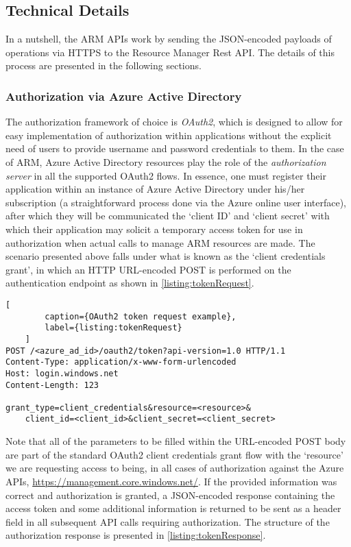 \documentclass[11pt]{report}
\begin{document}
\subsection{Technical Details}

In a nutshell, the ARM APIs work by sending the JSON-encoded payloads of
operations via HTTPS to the Resource Manager Rest API. The details
of this process are presented in the following sections.

\subsubsection{Authorization via Azure Active Directory}

The authorization framework of choice is \textit{OAuth2}, which is designed to
allow for easy implementation of authorization within applications without the
explicit need of users to provide username and password credentials to them. In
the case of ARM, Azure Active Directory resources play the role of the
\textit{authorization server} in all the supported OAuth2 flows. \newline
In essence, one must register their application within an instance of Azure
Active Directory under his/her subscription (a straightforward process done
via the Azure online user interface), after which they will be
communicated the `client ID' and `client secret' with which their application
may solicit a temporary access token for use in authorization when actual calls
to manage ARM resources are made. The scenario presented above falls under what
is known as the `client credentials grant', in which an HTTP URL-encoded POST
is performed on the authentication endpoint as shown in \autoref{listing:tokenRequest}.

\begin{lstlisting}[
        caption={OAuth2 token request example},
        label={listing:tokenRequest}
    ]
POST /<azure_ad_id>/oauth2/token?api-version=1.0 HTTP/1.1
Content-Type: application/x-www-form-urlencoded
Host: login.windows.net
Content-Length: 123

grant_type=client_credentials&resource=<resource>&
    client_id=<client_id>&client_secret=<client_secret>
\end{lstlisting}

Note that all of the parameters to be filled within the URL-encoded POST body
are part of the standard OAuth2 client credentials grant flow with the
`resource' we are requesting access to being, in all cases of authorization
against the Azure APIs, \url{https://management.core.windows.net/}.
If the provided information was correct and authorization is granted,
a JSON-encoded response containing the access token and some
additional information is returned to be sent as a header field in all
subsequent API calls requiring authorization. The structure of the
authorization response is presented in \autoref{listing:tokenResponse}.
\end{document}
